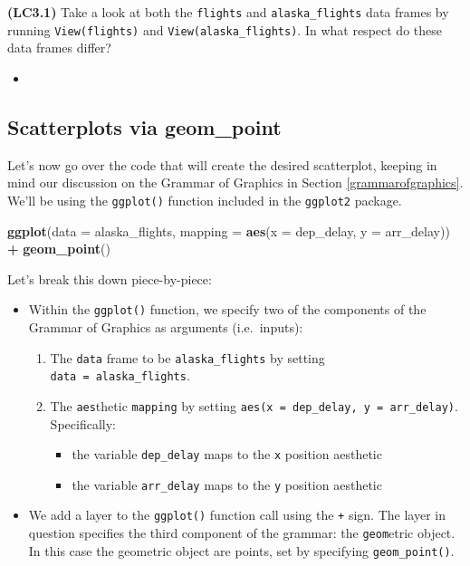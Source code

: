 \documentclass[12pt, krantz2,]{krantz}
\makeatletter
\newenvironment{Shaded}{\begin{snugshade}}{\end{snugshade}}
\newcommand{\DataTypeTok}[1]{\textcolor[rgb]{0.27,0.27,0.27}{#1}}
\newcommand{\KeywordTok}[1]{\textcolor[rgb]{0.27,0.27,0.27}{\textbf{#1}}}
\newcommand{\NormalTok}[1]{#1}
\newcommand{\OperatorTok}[1]{\textcolor[rgb]{0.43,0.43,0.43}{\textbf{#1}}}
\newcommand{\StringTok}[1]{\textcolor[rgb]{0.5,0.5,0.5}{#1}}
\providecommand{\tightlist}{%
  \setlength{\itemsep}{0pt}\setlength{\parskip}{0pt}}
\newenvironment{kframe}{%
\medskip{}
\setlength{\fboxsep}{.8em}
 \def\at@end@of@kframe{}%
 \ifinner\ifhmode%
  \def\at@end@of@kframe{\end{minipage}}%
  \begin{minipage}{\columnwidth}%
 \fi\fi%
 \def\FrameCommand##1{\hskip\@totalleftmargin \hskip-\fboxsep
 \colorbox{shadecolor}{##1}\hskip-\fboxsep
     \hskip-\linewidth \hskip-\@totalleftmargin \hskip\columnwidth}%
 \MakeFramed {\advance\hsize-\width
   \@totalleftmargin\z@ \linewidth\hsize
   \@setminipage}}%
 {\par\unskip\endMakeFramed%
 \at@end@of@kframe}
\renewenvironment{Shaded}{\begin{kframe}}{\end{kframe}}
\newenvironment{rmdblock}[1]
  {\begin{shaded*}
  \begin{itemize}
  \renewcommand{\labelitemi}{
    \raisebox{-.7\height}[0pt][0pt]{
    }
  }
  \item
  }
  {
  \end{itemize}
  \end{shaded*}
  }
\newenvironment{learncheck}
  {\begin{rmdblock}{warning}}
  {\end{rmdblock}}
\makeatother
\begin{document}
\textbf{(LC3.1)} Take a look at both the \texttt{flights} and \texttt{alaska\_flights} data frames by running \texttt{View(flights)} and \texttt{View(alaska\_flights)}. In what respect do these data frames differ?

\begin{learncheck}

\end{learncheck}

\hypertarget{geompoint}{%
\subsection{Scatterplots via geom\_point}\label{geompoint}}

Let's now go over the code that will create the desired scatterplot, keeping in mind our discussion on the Grammar of Graphics in Section \ref{grammarofgraphics}. We'll be using the \texttt{ggplot()} function included in the \texttt{ggplot2} package.

\begin{Shaded}
\begin{Highlighting}[]
\KeywordTok{ggplot}\NormalTok{(}\DataTypeTok{data =}\NormalTok{ alaska_flights, }\DataTypeTok{mapping =} \KeywordTok{aes}\NormalTok{(}\DataTypeTok{x =}\NormalTok{ dep_delay, }\DataTypeTok{y =}\NormalTok{ arr_delay)) }\OperatorTok{+}\StringTok{ }
\StringTok{  }\KeywordTok{geom_point}\NormalTok{()}
\end{Highlighting}
\end{Shaded}

Let's break this down piece-by-piece:

\begin{itemize}
\tightlist
\item
  Within the \texttt{ggplot()} function, we specify two of the components of the Grammar of Graphics as arguments (i.e.~inputs):

  \begin{enumerate}
  \def\labelenumi{\arabic{enumi}.}
  \tightlist
  \item
    The \texttt{data} frame to be \texttt{alaska\_flights} by setting \texttt{data\ =\ alaska\_flights}.
  \item
    The \texttt{aes}thetic \texttt{mapping} by setting \texttt{aes(x\ =\ dep\_delay,\ y\ =\ arr\_delay)}. Specifically:

    \begin{itemize}
    \tightlist
    \item
      the variable \texttt{dep\_delay} maps to the \texttt{x} position aesthetic
    \item
      the variable \texttt{arr\_delay} maps to the \texttt{y} position aesthetic
    \end{itemize}
  \end{enumerate}
\item
  We add a layer to the \texttt{ggplot()} function call using the \texttt{+} sign. The layer in question specifies the third component of the grammar: the \texttt{geom}etric object. In this case the geometric object are points, set by specifying \texttt{geom\_point()}.
\end{itemize}
\end{document}
